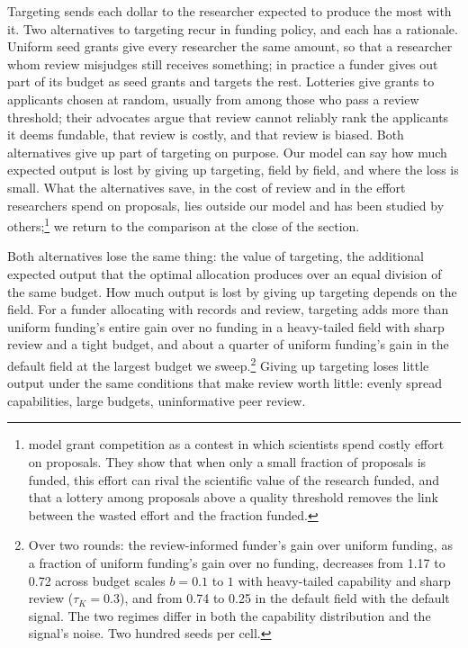 \documentclass[article, 11pt, reqno]{amsart}
\theoremstyle{named}
\begin{document}
Targeting sends each dollar to the researcher expected to produce the most with it.
Two alternatives to targeting recur in funding policy, and each has a rationale.
Uniform seed grants give every researcher the same amount, so that a researcher whom
review misjudges still receives something; in practice a funder gives out part of its
budget as seed grants and targets the rest. Lotteries give grants to applicants chosen
at random, usually from among those who pass a review threshold; their advocates
argue that review cannot reliably rank the applicants it deems fundable, that review
is costly, and that review is biased. Both alternatives give up part of targeting on
purpose. Our model can say how much expected output is lost by giving up targeting,
field by field, and where the loss is small. What the alternatives save, in the cost of
review and in the effort researchers spend on proposals, lies outside our model and
has been studied by others;\footnote{\citet{GrossBergstrom2019} model grant
competition as a contest in which scientists spend costly effort on proposals. They
show that when only a small fraction of proposals is funded, this effort can rival
the scientific value of the research funded, and that a lottery among proposals above
a quality threshold removes the link between the wasted effort and the fraction
funded.} we return to the comparison at the close of the section.

Both alternatives lose the same thing: the value of targeting, the additional expected
output that the optimal allocation produces over an equal division of the same
budget. How much output is lost by giving up targeting depends on the field. For a
funder allocating with records and review, targeting adds more than uniform funding's
entire gain over no funding in a heavy-tailed field with sharp review and a tight
budget, and about a quarter of uniform funding's gain in the default field at the
largest budget we sweep.\footnote{Over two rounds: the review-informed funder's gain
over uniform funding, as a fraction of uniform funding's gain over no funding,
decreases from 1.17 to 0.72 across budget scales $b = 0.1$ to $1$ with heavy-tailed
capability and sharp review ($\tau_K = 0.3$), and from 0.74 to 0.25 in the default
field with the default signal. The two regimes differ in both the capability
distribution and the signal's noise. Two hundred seeds per cell.} Giving up targeting
loses little output under the same conditions that make review worth little: evenly
spread capabilities, large budgets, uninformative peer review.
\end{document}
